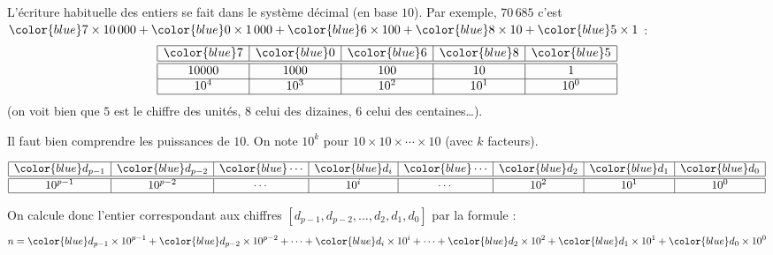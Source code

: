 \documentclass[11pt,class=report,crop=false]{standalone}
\begin{document}
\newcommand{\badletter}[1]{\underline{\textcolor{red}{#1}}}







\begin{cours}


L'écriture habituelle des entiers se fait dans le système décimal (en base $10$). Par exemple, $70\,685$ c'est 
${\color{blue}7} \times 10\,000
+{\color{blue}0} \times 1\,000
+{\color{blue}6} \times 100
+{\color{blue}8} \times 10 
+{\color{blue}5} \times 1$ : 
$$
\begin{array}{|c|c|c|c|c|}
  \hline
  {\color{blue}7} & {\color{blue}0} & {\color{blue}6} & {\color{blue}8} & {\color{blue}5} \\ 
  \hline\hline
  10000 & 1000 & 100 & 10 & 1 \\\hline
  10^4 & 10^3 & 10^2 & 10^1 & 10^0 \\
  \hline
\end{array}
$$   
(on voit bien que $5$ est le chiffre des unités, $8$ celui des dizaines, $6$ celui des centaines\ldots). 

Il faut bien comprendre les puissances de $10$. On note $10^k$ pour $10 \times 10 \times \cdots \times 10$ (avec $k$ facteurs).

$$
\begin{array}{|c|c|c|c|c|c|c|c|}
  \hline
  {\color{blue}d_{p-1}} & {\color{blue}d_{p-2}}& {\color{blue}\cdots} & {\color{blue}d_i}& {\color{blue}\cdots} & {\color{blue}d_2} & {\color{blue}d_1} & {\color{blue}d_0} \\ 
  \hline\hline
  10^{p-1} & 10^{p-2} & \cdots & 10^i &\cdots & 10^2 & 10^1 & 10^0 \\
  \hline
\end{array}
$$   
  
On calcule donc l'entier correspondant aux chiffres $[d_{p-1},d_{p-2}, \ldots,d_2,d_1,d_0]$ par la formule :
$$n = {\color{blue}d_{p-1}} \times 10^{p-1} + {\color{blue}d_{p-2}} \times 10^{p-2} + \cdots + {\color{blue}d_i} \times 10^{i} +  \cdots + {\color{blue}d_2} \times 10^2 + {\color{blue}d_1} \times 10^1 + {\color{blue}d_0} \times 10^0$$
\end{cours}
\end{document}
